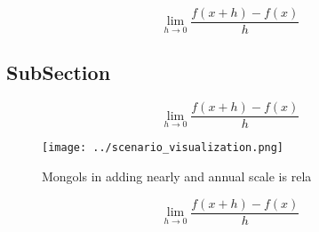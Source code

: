 \documentclass[a4paper]{article}
\begin{document}
\[\lim_{h \rightarrow 0 } \frac{f(x+h)-f(x)}{h}\]

\subsection{SubSection}

\[\lim_{h \rightarrow 0 } \frac{f(x+h)-f(x)}{h}\]

\begin{figure}
\centering
\texttt{[image: ../scenario\_visualization.png]}
\caption{Mongols in adding nearly and annual scale is rela
}
\end{figure}
 
\[\lim_{h \rightarrow 0 } \frac{f(x+h)-f(x)}{h}\]
\end{document}
